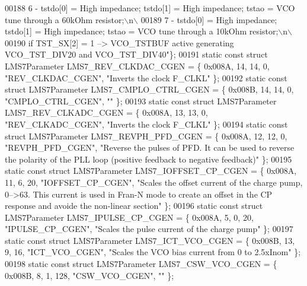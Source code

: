 \begin{DoxyCode}
00188 \textcolor{stringliteral}{6 - tstdo[0] = High impedance; tstdo[1] = High impedance; tstao = VCO tune through a 60kOhm resistor;\(\backslash\)n\(\backslash\)}
00189 \textcolor{stringliteral}{7 - tstdo[0] = High impedance; tstdo[1] = High impedance; tstao = VCO tune through a 10kOhm resistor;\(\backslash\)n\(\backslash\)}
00190 \textcolor{stringliteral}{if TST\_SX[2] = 1 --> VCO\_TSTBUF active generating VCO\_TST\_DIV20 and VCO\_TST\_DIV40"}\};
00191 \textcolor{keyword}{static} \textcolor{keyword}{const} \textcolor{keyword}{struct }LMS7Parameter LMS7_REV_CLKDAC_CGEN = \{ 0x008A, 14, 14, 0, \textcolor{stringliteral}{"REV\_CLKDAC\_CGEN"}, \textcolor{stringliteral}{"Inverts
       the clock F\_CLKL"} \};
00192 \textcolor{keyword}{static} \textcolor{keyword}{const} \textcolor{keyword}{struct }LMS7Parameter LMS7_CMPLO_CTRL_CGEN = \{ 0x008B, 14, 14, 0, \textcolor{stringliteral}{"CMPLO\_CTRL\_CGEN"}, \textcolor{stringliteral}{""} \};
00193 \textcolor{keyword}{static} \textcolor{keyword}{const} \textcolor{keyword}{struct }LMS7Parameter LMS7_REV_CLKADC_CGEN = \{ 0x008A, 13, 13, 0, \textcolor{stringliteral}{"REV\_CLKADC\_CGEN"}, \textcolor{stringliteral}{"Inverts
       the clock F\_CLKL"} \};
00194 \textcolor{keyword}{static} \textcolor{keyword}{const} \textcolor{keyword}{struct }LMS7Parameter LMS7_REVPH_PFD_CGEN = \{ 0x008A, 12, 12, 0, \textcolor{stringliteral}{"REVPH\_PFD\_CGEN"}, \textcolor{stringliteral}{"Reverse the
       pulses of PFD. It can be used to reverse the polarity of the PLL loop (positive feedback to negative
       feedback)"} \};
00195 \textcolor{keyword}{static} \textcolor{keyword}{const} \textcolor{keyword}{struct }LMS7Parameter LMS7_IOFFSET_CP_CGEN = \{ 0x008A, 11, 6, 20, \textcolor{stringliteral}{"IOFFSET\_CP\_CGEN"}, \textcolor{stringliteral}{"Scales
       the offset current of the charge pump, 0-->63. This current is used in Fran-N mode to create an offset in the
       CP response and avoide the non-linear section"} \};
00196 \textcolor{keyword}{static} \textcolor{keyword}{const} \textcolor{keyword}{struct }LMS7Parameter LMS7_IPULSE_CP_CGEN = \{ 0x008A, 5, 0, 20, \textcolor{stringliteral}{"IPULSE\_CP\_CGEN"}, \textcolor{stringliteral}{"Scales the
       pulse current of the charge pump"} \};
00197 \textcolor{keyword}{static} \textcolor{keyword}{const} \textcolor{keyword}{struct }LMS7Parameter LMS7_ICT_VCO_CGEN = \{ 0x008B, 13, 9, 16, \textcolor{stringliteral}{"ICT\_VCO\_CGEN"}, \textcolor{stringliteral}{"Scales the VCO
       bias current from 0 to 2.5xInom"} \};
00198 \textcolor{keyword}{static} \textcolor{keyword}{const} \textcolor{keyword}{struct }LMS7Parameter LMS7_CSW_VCO_CGEN = \{ 0x008B, 8, 1, 128, \textcolor{stringliteral}{"CSW\_VCO\_CGEN"}, \textcolor{stringliteral}{""} \};

\end{DoxyCode}
